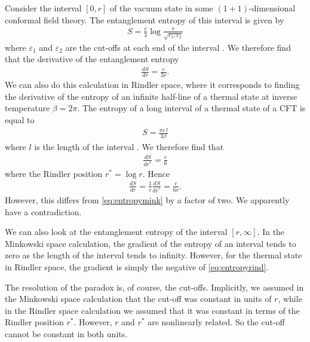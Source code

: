 \documentclass[11pt,a4paper]{article}
\begin{document}
Consider the interval $[0,r]$ of the vacuum state in some $(1+1)$-dimensional conformal field theory. The entanglement entropy of this interval is given by
\begin{align} \label{eq:cutoffsrindler}
S = \frac{c}{3} \log \frac{r}{\sqrt{\varepsilon_1, \varepsilon_2}}
\end{align}
where $\varepsilon_1$ and $\varepsilon_2$ are the cut-offs at each end of the interval \cite{calabrese2004entanglement, calabrese2009entanglement}. We therefore find that the derivative of the entanglement entropy
\begin{align} \label{eq:entropymink}
\frac{d S}{d r} = \frac{c}{3 r}.
\end{align}
We can also do this calculation in Rindler space, where it corresponds to finding the derivative of the entropy of an infinite half-line of a thermal state at inverse temperature $\beta = 2 \pi$. The entropy of a long interval of a thermal state of a CFT is equal to
\begin{align}
S = \frac{\pi c\, l}{3 \beta}
\end{align}
where $l$ is the length of the interval \cite{calabrese2004entanglement, calabrese2009entanglement}. We therefore find that
\begin{align}
\frac{d S}{d r^{*}} = \frac{c}{6}
\end{align}
where the Rindler position $r^* = \log r$. Hence
\begin{align} \label{eq:entropyrind}
\frac{d S}{d r} = \frac{1}{r} \frac{d S}{d r^*} = \frac{c}{6 r}.
\end{align}
However, this differs from \eqref{eq:entropymink} by a factor of two. We apparently have a contradiction. 

We can also look at the entanglement entropy of the interval $[r,\infty]$. In the Minkowski space calculation, the gradient of the entropy of an interval tends to zero as the length of the interval tends to infinity. However, for the thermal state in Rindler space, the gradient is simply the negative of \eqref{eq:entropyrind}.

The resolution of the paradox is, of course, the cut-offs. Implicitly, we assumed in the Minkowski space calculation that the cut-off was constant in units of $r$, while in the Rindler space calculation we assumed that it was constant in terms of the Rindler position $r^*$. However, $r$ and $r^*$ are nonlinearly related. So the cut-off cannot be constant in both units.
\end{document}
